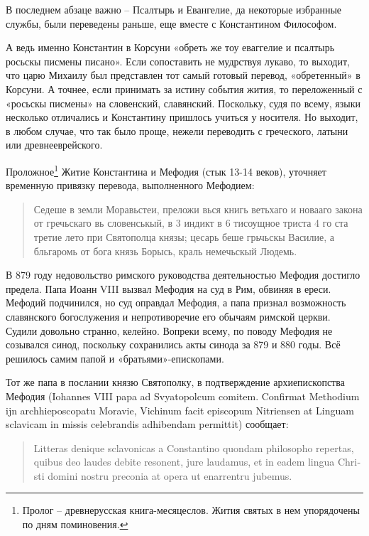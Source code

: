В последнем абзаце важно – Псалтырь и Евангелие, да некоторые избранные службы, были переведены раньше, еще вместе с Константином Философом. 

А ведь именно Константин в Корсуни «обреть же тоу еваггелие и псалтырь росьскы писмены писано». Если сопоставить не мудрствуя лукаво, то выходит, что царю Михаилу был представлен тот самый готовый перевод, «обретенный» в Корсуни. А точнее, если принимать за истину события жития, то переложенный с «росьскы писмены» на словенский, славянский. Поскольку, судя по всему, языки несколько отличались и Константину пришлось учиться у носителя. Но выходит, в любом случае, что так было проще, нежели переводить с греческого, латыни или древнееврейского.

Проложное\footnote{Пролог – древнерусская книга-месяцеслов. Жития святых в нем упорядочены по дням поминовения.} Житие Константина и Мефодия (стык 13-14 веков), уточняет временную привязку перевода, выполненного Мефодием:

\begin{quotation}
Седеше в земли Моравьстеи, преложи вься книгь ветьхаго и новааго закона от гречьскаго вь словенськый, в 3 индикт в 6 тисоущное триста 4 го ста третие лето при Святополца князы; цесарь беше грьчьскы Василие, а бльгаромь от бога князь Борысь, краль немечьскый Людемь.
\end{quotation}

В 879 году недовольство римского руководства деятельностью Мефодия достигло предела. Папа Иоанн VIII вызвал Мефодия на суд в Рим, обвиняя в ереси. Мефодий подчинился, но суд оправдал Мефодия, а папа признал возможность славянского богослужения и непротиворечие его обычаям римской церкви. Судили довольно странно, келейно. Вопреки всему, по поводу Мефодия не созывался синод, поскольку сохранились акты синода за 879 и 880 годы. Всё решилось самим папой и «братьями»-епископами.

Тот же папа в послании князю Святополку, в подтверждение архиепископства Мефодия (Iohannes VIII papa ad Svyatopolcum comitem. Confirmat Methodium ijn archhieposcopatu Moravie, Vichinum facit episcopum Nitriensen at Linguam sclavicam in missis celebrandis adhi\-bendam permittit) сообщает:

\begin{quotation}
\begin{otherlanguage}{latin}
Litteras denique sclavonicas a Constantino quondam philosopho repertas, quibus deo laudes debite resonent, jure laudamus, et in eadem lingua Christi domini nostru preconia at opera ut enarren\-tru jubemus.
\end{otherlanguage}
\end{quotation}

